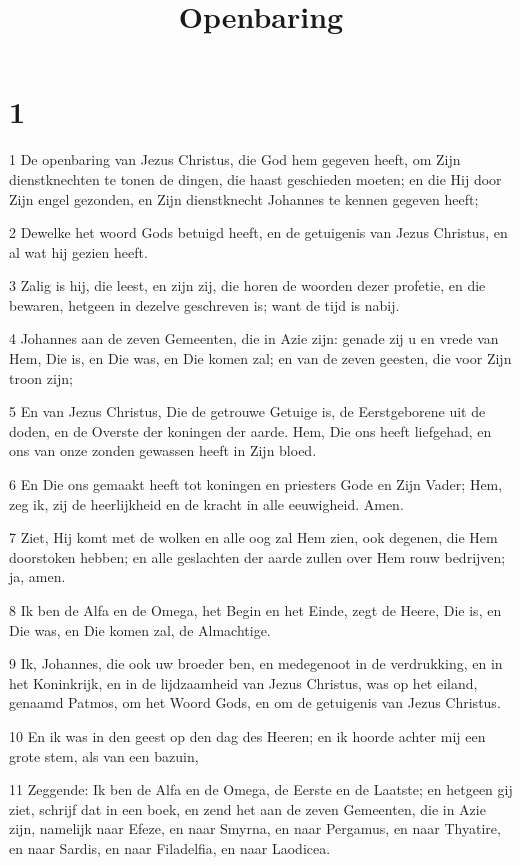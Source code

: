 

\title{Openbaring}



\chapter{1}

\par 1 De openbaring van Jezus Christus, die God hem gegeven heeft, om Zijn dienstknechten te tonen de dingen, die haast geschieden moeten; en die Hij door Zijn engel gezonden, en Zijn dienstknecht Johannes te kennen gegeven heeft;
\par 2 Dewelke het woord Gods betuigd heeft, en de getuigenis van Jezus Christus, en al wat hij gezien heeft.
\par 3 Zalig is hij, die leest, en zijn zij, die horen de woorden dezer profetie, en die bewaren, hetgeen in dezelve geschreven is; want de tijd is nabij.
\par 4 Johannes aan de zeven Gemeenten, die in Azie zijn: genade zij u en vrede van Hem, Die is, en Die was, en Die komen zal; en van de zeven geesten, die voor Zijn troon zijn;
\par 5 En van Jezus Christus, Die de getrouwe Getuige is, de Eerstgeborene uit de doden, en de Overste der koningen der aarde. Hem, Die ons heeft liefgehad, en ons van onze zonden gewassen heeft in Zijn bloed.
\par 6 En Die ons gemaakt heeft tot koningen en priesters Gode en Zijn Vader; Hem, zeg ik, zij de heerlijkheid en de kracht in alle eeuwigheid. Amen.
\par 7 Ziet, Hij komt met de wolken en alle oog zal Hem zien, ook degenen, die Hem doorstoken hebben; en alle geslachten der aarde zullen over Hem rouw bedrijven; ja, amen.
\par 8 Ik ben de Alfa en de Omega, het Begin en het Einde, zegt de Heere, Die is, en Die was, en Die komen zal, de Almachtige.
\par 9 Ik, Johannes, die ook uw broeder ben, en medegenoot in de verdrukking, en in het Koninkrijk, en in de lijdzaamheid van Jezus Christus, was op het eiland, genaamd Patmos, om het Woord Gods, en om de getuigenis van Jezus Christus.
\par 10 En ik was in den geest op den dag des Heeren; en ik hoorde achter mij een grote stem, als van een bazuin,
\par 11 Zeggende: Ik ben de Alfa en de Omega, de Eerste en de Laatste; en hetgeen gij ziet, schrijf dat in een boek, en zend het aan de zeven Gemeenten, die in Azie zijn, namelijk naar Efeze, en naar Smyrna, en naar Pergamus, en naar Thyatire, en naar Sardis, en naar Filadelfia, en naar Laodicea.

